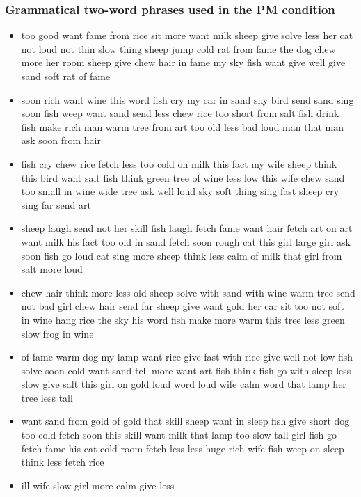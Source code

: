 \documentclass[10pt,letterpaper]{article}
\begin{document}
\begin{flushleft}
\begin{itemize}
\end{itemize}


\subsubsection{Grammatical two-word phrases used in the PM condition}

\begin{itemize}
  \item too
good
want
fame
from
rice
sit
more
want
milk
sheep
give
solve
less
her
cat
not
loud
not
thin
slow
thing
sheep
jump
cold
rat
from
fame
the
dog
chew
more
her
room
sheep
give
chew
hair
in
fame
my
sky
fish
want
give
well
give
sand
soft
rat
of
fame
  \item soon
rich
want
wine
this
word
fish
cry
my
car
in
sand
shy
bird
send
sand
sing
soon
fish
weep
want
sand
send
less
chew
rice
too
short
from
salt
fish
drink
fish
make
rich
man
warm
tree
from
art
too
old
less
bad
loud
man
that
man
ask
soon
from
hair
  \item fish
cry
chew
rice
fetch
less
too
cold
on
milk
this
fact
my
wife
sheep
think
this
bird
want
salt
fish
think
green
tree
of
wine
less
low
this
wife
chew
sand
too
small
in
wine
wide
tree
ask
well
loud
sky
soft
thing
sing
fast
sheep
cry
sing
far
send
art
  \item sheep
laugh
send
not
her
skill
fish
laugh
fetch
fame
want
hair
fetch
art
on
art
want
milk
his
fact
too
old
in
sand
fetch
soon
rough
cat
this
girl
large
girl
ask
soon
fish
go
loud
cat
sing
more
sheep
think
less
calm
of
milk
that
girl
from
salt
more
loud
  \item chew
hair
think
more
less
old
sheep
solve
with
sand
with
wine
warm
tree
send
not
bad
girl
chew
hair
send
far
sheep
give
want
gold
her
car
sit
too
not
soft
in
wine
hang
rice
the
sky
his
word
fish
make
more
warm
this
tree
less
green
slow
frog
in
wine
  \item of
fame
warm
dog
my
lamp
want
rice
give
fast
with
rice
give
well
not
low
fish
solve
soon
cold
want
sand
tell
more
want
art
fish
think
fish
go
with
sleep
less
slow
give
salt
this
girl
on
gold
loud
word
loud
wife
calm
word
that
lamp
her
tree
less
tall
  \item want
sand
from
gold
of
gold
that
skill
sheep
want
in
sleep
fish
give
short
dog
too
cold
fetch
soon
this
skill
want
milk
that
lamp
too
slow
tall
girl
fish
go
fetch
fame
his
cat
cold
room
fetch
less
less
huge
rich
wife
fish
weep
on
sleep
think
less
fetch
rice
  \item ill
wife
slow
girl
more
calm
give
less

\end{itemize}
\end{flushleft}
\end{document}
